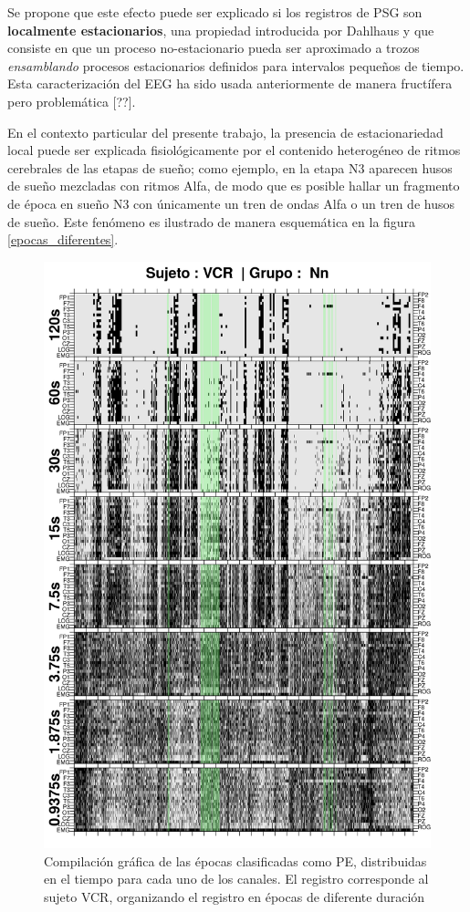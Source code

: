 Se propone que este efecto puede ser explicado si los registros de PSG son \textbf{localmente
estacionarios}, una propiedad introducida por Dahlhaus \cite{Dahlhaus97} y que consiste en que un
proceso no-estacionario pueda ser aproximado a trozos \textit{ensamblando} procesos estacionarios
definidos para intervalos pequeños de tiempo.
Esta caracterización del EEG ha sido usada anteriormente de manera fructífera pero problemática
[??].

En el contexto particular del presente trabajo, la presencia de estacionariedad local puede ser
explicada fisiológicamente por el contenido heterogéneo de ritmos cerebrales de las etapas de 
sueño; como ejemplo, en la etapa N3 aparecen husos de sueño mezcladas con ritmos Alfa, de modo
que es posible hallar un fragmento de época en sueño N3 con únicamente un tren de ondas Alfa
o un tren de husos de sueño.
Este fenómeno es ilustrado de manera esquemática en la figura \ref{epocas_diferentes}.

\begin{figure}
\centering
\includegraphics[width=0.7\linewidth]
{./img_ejemplos/VCNNS1_comp_est_.png}
\caption{Compilación gráfica de las épocas clasificadas como PE, distribuidas en el tiempo
para cada uno de los canales. El registro corresponde al sujeto VCR, organizando el registro en
épocas de diferente duración}
\label{comp_VCR}
\end{figure}

